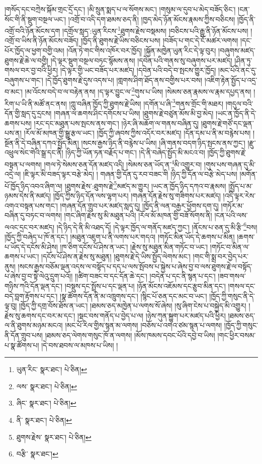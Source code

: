 །གསོད་དང་བཀྲེས་སྐོམ་གྲང་དྲོ་དང་། །མི་སྲུན་སྨད་པ་ལ་སོགས་མང་། །གསུམ་ལ་དུབ་པ་མེད་བཟོད་ཅིང་། །ངན་སོང་གི་ནི་སྡུག་བསྔལ་ཡང་། །འགྲོ་བ་འདི་དག་ཐམས་ཅད་ནི། །ཁྱད་མེད་ཉོན་མོངས་རྣམས་ཀྱིས་བཅིངས། །ཁྱོད་ནི་འགྲོ་བའི་ཉོན་མོངས་དག །དགྲོལ་སླད་:ཡུན་རིངས་\footnote{ཡུན་རིང་  སྣར་ཐང་།  པེ་ཅིན། }ཐུགས་རྗེས་བསྡམས། །བཅིངས་པའི་རྒྱུ་ནི་ཉོན་མོངས་པས། །འགྲོ་བ་ཡིས་ནི་ཉོན་མོངས་བཟོད། །ཁྱོད་ནི་ཐུགས་རྗེ་ཡིས་བཅིངས་པས། །བཟོད་པ་གང་དེ་ངོ་མཚར་ལགས། །དང་པོར་ཁྱོད་ལ་ཕྱག་བགྱི་འམ། །འོན་ཏེ་གང་གིས་འཁོར་བར་ཁྱོད། །སྐྱོན་མཁྱེན་ཡུན་རིང་དེ་ལྟ་བུར། །བཞུགས་མཛད་ཐུགས་རྗེ་ཆེ་ལ་བགྱི། །དེ་ལྟར་སྡུག་བསྔལ་བཏང་སྙོམས་ནས། །དབེན་པའི་གནས་སུ་བཞུགས་པར་མཛད། །ཤིན་ཏུ་གསལ་བར་བྱ་བའི་ཕྱིར། །དེ་ལྟར་གྱི་ཡང་བཟོད་པར་མཛད། །དབེན་པའི་བདེ་བ་སྤངས་གྱུར་ཁྱོད། །མང་པོའི་ནང་དུ་བཞུགས་པ་གང་། །དེ་ཁྱོད་ཐུགས་རྗེ་དུས་འདས་པ། །གླགས་ཤིག་ཐོད་ནས་བགྱིས་པར་བས། །འཇིག་རྟེན་སྤྱོད་པ་འདྲ་བ་མང་། །མ་འོངས་བདེ་བ་ལ་བརྟེན་ནས། །ད་ལྟར་བྱུང་ལ་\footnote{ལས་  སྣར་ཐང་།  པེ་ཅིན། }གུས་པ་ཡིས། །སེམས་ཅན་རྣམས་ལ་རྣམ་དཔྱད་ནས། །རིག་པ་ཡི་ནི་མཚོ་ནང་ནས། །ཀླུ་བཞིན་ཁྱོད་ཀྱི་ཐུགས་རྗེ་ཡིས། །དགོན་པ་ཞི་\footnote{ཞིང་  སྣར་ཐང་།  པེ་ཅིན། }གནས་གྲོང་གི་མཐར། །གདུལ་བའི་དོན་གྱི་སླད་དུ་དྲངས། །གཞན་ལ་ཆགས་ཤིང་དགོངས་པ་ཡིས། །ཐུགས་རྗེ་བཙུན་མོས་མི་བྱ་མེད། །ཡང་ན་ཁྱོད་ནི་དེ་ཆགས་པས། །རང་དང་མཐུན་པས་སྤངས་ནས་གང་། །ཉེར་ཞི་མཆོག་ལ་གནས་བཞིན་དུ། །ཐུགས་རྗེ་གཙོ་དང་ལྡན་པས་ན། །རོལ་མོ་མཁན་གྱི་སྒྱུ་རྩལ་ཡང་། །ཁྱོད་ཀྱི་ཞབས་ཀྱིས་འདོར་བར་མཛད། །དོན་དམ་པ་ནི་མ་བརྙེས་པས། །སྔོན་ནི་དེ་བཞིན་དཀའ་སྤྱོད་མིན། །སངས་རྒྱས་ཉིད་ནི་བརྙེས་པ་ཡིས། །ཞི་གནས་བདག་ཉིད་སྤངས་ནས་ཀྱང་། །རྫུ་འཕྲུལ་སེང་གེའི་སྒྲ་དང་ནི། །ཉིད་ཀྱི་ཡོན་ཏན་བརྗོད་པ་གང་། །དེ་ནི་བཞེད་སྤྱོད་མི་མངའ་བ། །ཁྱོད་ཀྱི་ཐུགས་རྗེ་བསྟན་པ་ལགས། །གལ་ཏེ་སེམས་ཅན་དོན་མཛད་འདི། །སེམས་ཅན་ཡོད་ན་\footnote{ནི་  སྣར་ཐང་།  པེ་ཅིན། }མི་འགྱུར་བ། །གུས་པས་གཞན་དུ་མི་འདྲེ་ལ། །ཇི་ལྟར་མི་བཟད་ལྟར་བརྩེ་མེད། །
གཞན་གྱི་དོན་དུ་རབ་བཟང་གི །ཉིད་ཀྱི་དོན་ལ་བརྩེ་མེད་པས། །མགོན་པོ་ཁྱོད་ཉིད་འབའ་ཞིག་ལ། །ཐུགས་རྗེས་:ཐུགས་རྗེ་\footnote{ཐུགས་རྗེས་  སྣར་ཐང་།  པེ་ཅིན། }མཛད་མ་གྱུར། །ཡང་ན་ཁྱོད་ཉིད་དཀའ་བ་རྣམས། །སྤྱོད་པ་མ་ཉམས་དེས་ནི་མཛད། །ཁྱོད་ཀྱིས་ཉིད་དོན་ལས་ལྷག་པར། །གཞན་དོན་རྗེས་སུ་གཟིགས་པར་མཛད། །འདི་ལྟར་རེས་འགའ་བསྟན་པས་གང་། །གཞན་དོན་གྲུབ་པར་མཛད་སླད་དུ། །ཁྱོད་ནི་ལན་བརྒྱར་ཕྱོགས་དག་དུ། །གཏོར་མ་བཞིན་དུ་བཏང་བ་ལགས། །གང་ཞིག་རྗེས་སུ་མི་མཐུན་པའི། །རོལ་མོ་མཁན་གྱི་བཟོ་སོགས་ནི། །ངན་པའི་ལས་ལའང་དྲང་བར་མཛད། །དེ་ཉིད་དེ་ནི་མི་འཐད་དོ། །དེ་ལྟར་ཁྱོད་ལ་གནོད་མཛད་ཀྱང་། །ནོངས་པ་ཅན་དུ་མི་རྩི་\footnote{བརྩི་  སྣར་ཐང་། }བས། །ཁྱོད་ཀྱི་བཞེད་པ་ཁོ་ན་དང་། །མཐུན་འཇུག་པ་ནི་ལགས་པར་གདའ། །གཏོང་མིན་ཡོད་དེ་ཆགས་པ་མིན། །ཆགས་པ་ཡོད་དེ་དངོས་མི་ཤེས། །ཁ་ཅིག་དངོས་པོ་ཤེས་ན་ཡང་། །རྗེས་སུ་མཐུན་མིན་གཏོང་བ་ཡང་། །གཏོང་བ་མིན་ལ་ཆགས་པ་ཡང་། །དངོས་པོ་ཤེས་ན་རྗེས་སུ་མཐུན། །ཐུགས་རྗེ་དེ་ཡིས་སྤྱོད་ལེགས་མང་། །གང་གི་སྨྲ་བར་བྱེད་པར་ནུས། །སངས་རྒྱས་བཅོམ་ལྡན་འདས་ལ་བསྟོད་པ་དད་པ་ལས་སྤོབས་པ་སྐྱེས་པ་ཞེས་བྱ་བ་ལས་ཐུགས་རྗེ་ལ་བསྟོད་པ་ཞེས་བྱ་བ་སྟེ་ལེའུ་དྲུག་པའོ།། །།ཚིག་བཟང་བ་དང་དོན་ཆེ་དང་། །བདེན་པ་དང་ནི་སྙན་པ་དང་། །ཟབ་གསལ་གཉིས་ཀའི་དོན་ལྡན་དང་། །བསྡུས་དང་སྤྲོས་པ་དང་ལྡན་པ། །ཉོན་མོངས་འཇོམས་དང་རྩུབ་མིན་དང་། །གསལ་དང་བདེ་བླག་རྟོགས་པ་དང་། །སྣ་ཚོགས་དོན་ནི་མ་འཁྲུགས་དང་། །སྙིང་པོ་ཅན་དང་མང་བ་ཡང་། །ཁྱོད་ཀྱི་གསུང་ནི་དེ་ལྟ་བུ། །ཁྱོད་ཀྱི་དགྲ་བོས་ཐོས་ན་ཡང་། །ཐམས་ཅད་མཁྱེན་པ་ལགས་སོ་ཞེས། །སུ་ཞིག་ངེས་པ་བསྐྱེད་མི་འགྱུར། །རྗེས་སུ་ཆགས་དང་བར་མ་དང་། །སྡང་བས་གནོད་པ་བྱེད་པ་ལ། །ཉེས་ཀུན་སྐྱུག་པར་མཛད་པའི་ཕྱིར། །ཐམས་ཅད་ལ་ནི་ཐུགས་མཉམ་མངའ། །མང་པོ་རིལ་གྱིས་སྙན་མ་ལགས། །བཅོས་པ་འགའ་ཙམ་སྙན་པ་ལགས། །ཁྱོད་ཀྱི་གསུང་ནི་དོན་གྲུབ་པས། །ཐམས་ཅད་ལེགས་གསུང་ཁོ་ན་ལགས། །མོས་ཁམས་དབང་པོའི་དབྱེ་བ་ཡིས། །གང་ཕྱིར་བསམ་པ་སྣ་ཚོགས་པ། །དེ་བས་ཐབས་ལ་མཁས་པ་ཡིས། །
